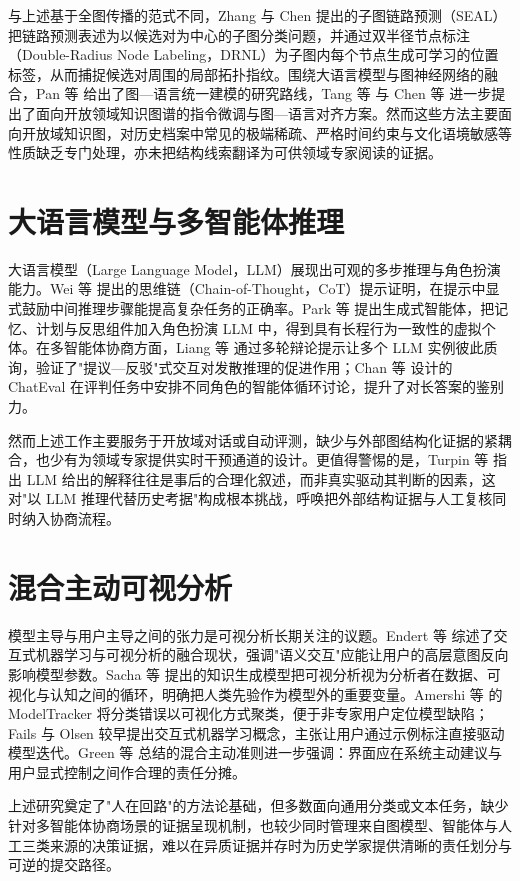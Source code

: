 与上述基于全图传播的范式不同，Zhang 与 Chen\citep{zhang2018seal} 提出的子图链路预测（SEAL）把链路预测表述为以候选对为中心的子图分类问题，并通过双半径节点标注（Double-Radius Node Labeling，DRNL）为子图内每个节点生成可学习的位置标签，从而捕捉候选对周围的局部拓扑指纹。围绕大语言模型与图神经网络的融合，Pan 等\citep{pan2024llmkg} 给出了图—语言统一建模的研究路线，Tang 等\citep{tang2024graphgpt} 与 Chen 等\citep{chen2024llaga} 进一步提出了面向开放领域知识图谱的指令微调与图—语言对齐方案。然而这些方法主要面向开放域知识图，对历史档案中常见的极端稀疏、严格时间约束与文化语境敏感等性质缺乏专门处理，亦未把结构线索翻译为可供领域专家阅读的证据。

\section{大语言模型与多智能体推理}\label{sec:related-llm-mas}

大语言模型（Large Language Model，LLM）展现出可观的多步推理与角色扮演能力。Wei 等\citep{wei2022cot} 提出的思维链（Chain-of-Thought，CoT）提示证明，在提示中显式鼓励中间推理步骤能提高复杂任务的正确率。Park 等\citep{park2023generative} 提出生成式智能体，把记忆、计划与反思组件加入角色扮演 LLM 中，得到具有长程行为一致性的虚拟个体。在多智能体协商方面，Liang 等\citep{liang2023llm} 通过多轮辩论提示让多个 LLM 实例彼此质询，验证了"提议—反驳"式交互对发散推理的促进作用；Chan 等\citep{chan2023chateval} 设计的 ChatEval 在评判任务中安排不同角色的智能体循环讨论，提升了对长答案的鉴别力。

然而上述工作主要服务于开放域对话或自动评测，缺少与外部图结构化证据的紧耦合，也少有为领域专家提供实时干预通道的设计。更值得警惕的是，Turpin 等\citep{turpin2023faithfulness} 指出 LLM 给出的解释往往是事后的合理化叙述，而非真实驱动其判断的因素，这对"以 LLM 推理代替历史考据"构成根本挑战，呼唤把外部结构证据与人工复核同时纳入协商流程。

\section{混合主动可视分析}\label{sec:related-mixed-init}

模型主导与用户主导之间的张力是可视分析长期关注的议题。Endert 等\citep{endert2017state} 综述了交互式机器学习与可视分析的融合现状，强调"语义交互"应能让用户的高层意图反向影响模型参数。Sacha 等\citep{sacha2014knowledge} 提出的知识生成模型把可视分析视为分析者在数据、可视化与认知之间的循环，明确把人类先验作为模型外的重要变量。Amershi 等\citep{amershi2014modeltracker} 的 ModelTracker 将分类错误以可视化方式聚类，便于非专家用户定位模型缺陷；Fails 与 Olsen\citep{fails2003interactiveml} 较早提出交互式机器学习概念，主张让用户通过示例标注直接驱动模型迭代。Green 等\citep{green2009mixedinitiative} 总结的混合主动准则进一步强调：界面应在系统主动建议与用户显式控制之间作合理的责任分摊。

上述研究奠定了"人在回路"的方法论基础，但多数面向通用分类或文本任务，缺少针对多智能体协商场景的证据呈现机制，也较少同时管理来自图模型、智能体与人工三类来源的决策证据，难以在异质证据并存时为历史学家提供清晰的责任划分与可逆的提交路径。

